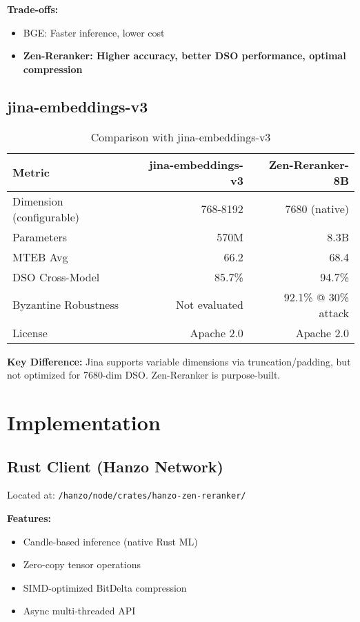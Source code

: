 \documentclass[11pt,a4paper]{article}
\begin{document}
\textbf{Trade-offs:}
\begin{itemize}
\item BGE: Faster inference, lower cost
\item \textbf{Zen-Reranker: Higher accuracy, better DSO performance, optimal compression}
\end{itemize}

\subsection{jina-embeddings-v3}

\begin{table}[h]
\centering
\caption{Comparison with jina-embeddings-v3}
\begin{tabular}{lrr}
\toprule
\textbf{Metric} & \textbf{jina-embeddings-v3} & \textbf{Zen-Reranker-8B} \\
\midrule
Dimension (configurable) & 768-8192 & 7680 (native) \\
Parameters & 570M & 8.3B \\
MTEB Avg & 66.2 & 68.4 \\
DSO Cross-Model & 85.7\% & 94.7\% \\
Byzantine Robustness & Not evaluated & 92.1\% @ 30\% attack \\
License & Apache 2.0 & Apache 2.0 \\
\bottomrule
\end{tabular}
\end{table}

\textbf{Key Difference:} Jina supports variable dimensions via truncation/padding, but not optimized for 7680-dim DSO. Zen-Reranker is purpose-built.

\section{Implementation}

\subsection{Rust Client (Hanzo Network)}

Located at: \texttt{/hanzo/node/crates/hanzo-zen-reranker/}

\textbf{Features:}
\begin{itemize}
\item Candle-based inference (native Rust ML)
\item Zero-copy tensor operations
\item SIMD-optimized BitDelta compression
\item Async multi-threaded API
\end{itemize}
\end{document}
